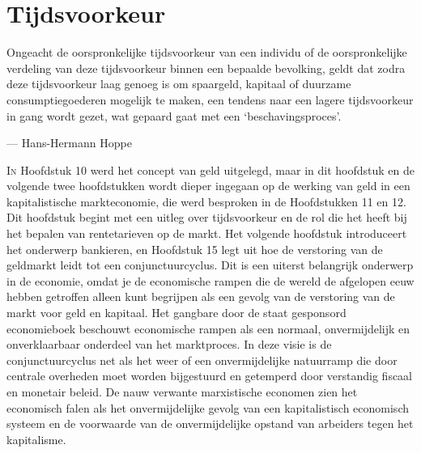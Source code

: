 \hypertarget{tijdsvoorkeur}{%
\chapter{Tijdsvoorkeur}\label{tijdsvoorkeur}}

\begin{blockquotebox}
    Ongeacht de oorspronkelijke tijdsvoorkeur van een individu of de oorspronkelijke verdeling van deze tijdsvoorkeur binnen een bepaalde bevolking, geldt dat zodra deze tijdsvoorkeur laag genoeg is om spaargeld, kapitaal of duurzame consumptiegoederen mogelijk te maken, een tendens naar een lagere tijdsvoorkeur in gang wordt gezet, wat gepaard gaat met een `beschavingsproces'.\footnotemark
    \par\raggedleft--- Hans-Hermann Hoppe
\end{blockquotebox}

\lettrine{I}n Hoofdstuk 10 werd het concept van geld uitgelegd, maar in dit hoofdstuk en de volgende twee hoofdstukken wordt dieper ingegaan op de werking van geld in een kapitalistische markteconomie, die werd besproken in de Hoofdstukken 11 en 12. Dit hoofdstuk begint met een uitleg over tijdsvoorkeur en de rol die het heeft bij het bepalen van rentetarieven op de markt. Het volgende hoofdstuk introduceert het onderwerp bankieren, en Hoofdstuk 15 legt uit hoe de verstoring van de geldmarkt leidt tot een conjunctuurcyclus. Dit is een uiterst belangrijk onderwerp in de economie, omdat je de economische rampen die de wereld de afgelopen eeuw hebben getroffen alleen kunt begrijpen als een gevolg van de verstoring van de markt voor geld en kapitaal. Het gangbare door de staat gesponsord economieboek beschouwt economische rampen als een normaal, onvermijdelijk en onverklaarbaar onderdeel van het marktproces. In deze visie is de conjunctuurcyclus net als het weer of een onvermijdelijke natuurramp die door centrale overheden moet worden bijgestuurd en getemperd door verstandig fiscaal en monetair beleid. De nauw verwante marxistische economen zien het economisch falen als het onvermijdelijke gevolg van een kapitalistisch economisch systeem en de voorwaarde van de onvermijdelijke opstand van arbeiders tegen het kapitalisme.

